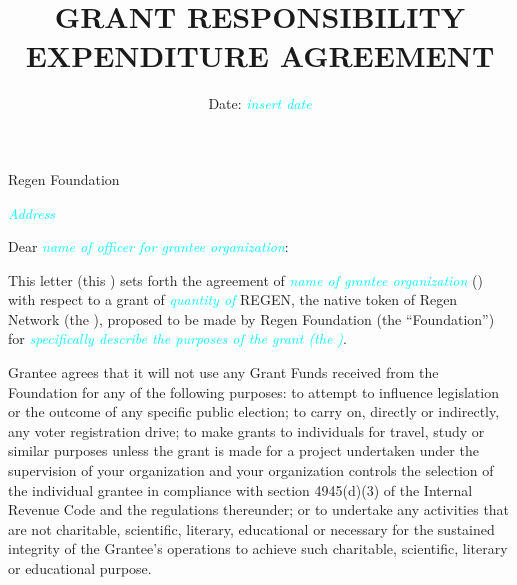 \documentclass{article}
\begin{document}
\title{GRANT RESPONSIBILITY EXPENDITURE  AGREEMENT}
\author{Date: \textcolor{cyan}{\emph{insert date}}}
\date{} 
\maketitle
\par
\begin{flushleft}
Regen Foundation
\par
\textcolor{cyan}{\emph{Address}}
\end{flushleft}
\par
Dear \textcolor{cyan}{\emph{name of officer for grantee organization}}:
\par
This letter (this ) sets forth the agreement of \textcolor{cyan}{\emph{name of grantee organization}} () with respect to a grant of \textcolor{cyan}{\emph{quantity of}} REGEN, the native token of Regen Network (the ), proposed to be made by Regen Foundation (the “Foundation”) for \textcolor{cyan}{\emph{specifically describe the purposes of the grant (the )}}.
\par
Grantee agrees that it will not use any Grant Funds received from the Foundation for any of the following purposes:  to attempt to influence legislation or the outcome of any specific public election; to carry on, directly or indirectly, any voter registration drive; to make grants to individuals for travel, study or similar purposes unless the grant is made for a project undertaken under the supervision of your organization and your organization controls the selection of the individual grantee in compliance with section 4945(d)(3) of the Internal Revenue Code and the regulations thereunder; or to undertake any activities that are not charitable, scientific, literary, educational or necessary for the sustained integrity of the Grantee’s operations to achieve such charitable, scientific, literary or educational purpose.      
\par
\end{document}

